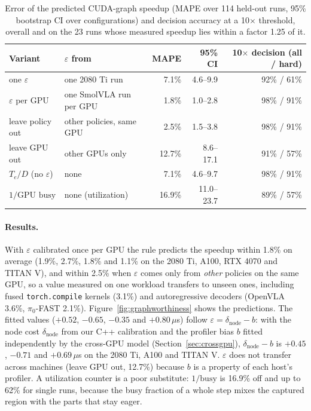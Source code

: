 \begin{table}[t]
\centering
\caption{Error of the predicted CUDA-graph speedup (MAPE over 114 held-out runs, 95\% bootstrap
CI over configurations) and decision accuracy at a 10$\times$ threshold, overall and on the 23
runs whose measured speedup lies within a factor 1.25 of it.}
\label{tab:graphworthiness}
\small
\begin{tabular}{llrrr}
\toprule
Variant & $\varepsilon$ from & MAPE & 95\% CI & 10$\times$ decision (all / hard) \\
\midrule
one $\varepsilon$        & one 2080 Ti run          & 7.1\%  & 4.6--9.9   & 92\% / 61\% \\
$\varepsilon$ per GPU    & one SmolVLA run per GPU  & 1.8\%  & 1.0--2.8   & 98\% / 91\% \\
leave policy out         & other policies, same GPU & 2.5\%  & 1.5--3.8   & 98\% / 91\% \\
leave GPU out            & other GPUs only          & 12.7\% & 8.6--17.1  & 91\% / 57\% \\
\midrule
$T_e/D$ (no $\varepsilon$) & none                   & 7.1\%  & 4.6--9.7   & 98\% / 91\% \\
$1/\text{GPU busy}$      & none (utilization)       & 16.9\% & 11.0--23.7 & 89\% / 57\% \\
\bottomrule
\end{tabular}
\end{table}

\paragraph{Results.}
With $\varepsilon$ calibrated once per GPU the rule predicts the speedup within 1.8\% on average
(1.9\%, 2.7\%, 1.8\% and 1.1\% on the 2080 Ti, A100, RTX 4070 and TITAN V), and within 2.5\% when
$\varepsilon$ comes only from \emph{other} policies on the same GPU, so a value measured on one
workload transfers to unseen ones, including fused \texttt{torch.compile} kernels (3.1\%) and
autoregressive decoders (OpenVLA 3.6\%, $\pi_0$-FAST 2.1\%). Figure~\ref{fig:graphworthiness}
shows the predictions. The fitted values ($+0.52$, $-0.65$, $-0.35$ and $+0.80\,\mu$s) follow
$\varepsilon = \delta_\text{node} - b$: with the node cost $\delta_\text{node}$ from our C++
calibration and the profiler bias $b$ fitted independently by the cross-GPU model
(Section~\ref{sec:crossgpu}), $\delta_\text{node} - b$ is $+0.45$, $-0.71$ and $+0.69\,\mu$s on
the 2080 Ti, A100 and TITAN V. $\varepsilon$ does not transfer across machines (leave GPU out,
12.7\%) because $b$ is a property of each host's profiler. A utilization counter is a poor
substitute: $1/\text{busy}$ is 16.9\% off and up to 62\% for single runs, because the busy
fraction of a whole step mixes the captured region with the parts that stay eager.

